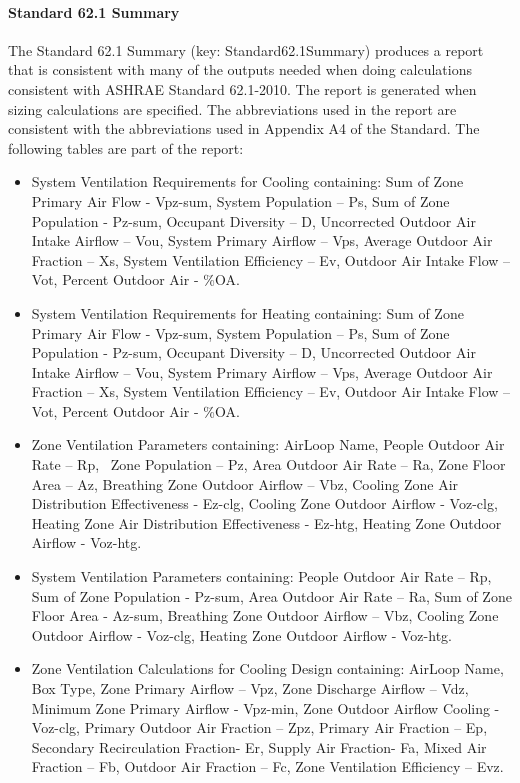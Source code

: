 \paragraph{Standard 62.1 Summary}\label{standard-62.1-summary}

The Standard 62.1 Summary (key: Standard62.1Summary) produces a report that is consistent with many of the outputs needed when doing calculations consistent with ASHRAE Standard 62.1-2010. The report is generated when sizing calculations are specified. The abbreviations used in the report are consistent with the abbreviations used in Appendix A4 of the Standard. The following tables are part of the report:

\begin{itemize}
\item
  System Ventilation Requirements for Cooling containing: Sum of Zone Primary Air Flow - Vpz-sum, System Population -- Ps, Sum of Zone Population - Pz-sum, Occupant Diversity -- D, Uncorrected Outdoor Air Intake Airflow -- Vou, System Primary Airflow -- Vps, Average Outdoor Air Fraction -- Xs, System Ventilation Efficiency -- Ev, Outdoor Air Intake Flow -- Vot, Percent Outdoor Air - \%OA.
\item
  System Ventilation Requirements for Heating containing: Sum of Zone Primary Air Flow - Vpz-sum, System Population -- Ps, Sum of Zone Population - Pz-sum, Occupant Diversity -- D, Uncorrected Outdoor Air Intake Airflow -- Vou, System Primary Airflow -- Vps, Average Outdoor Air Fraction -- Xs, System Ventilation Efficiency -- Ev, Outdoor Air Intake Flow -- Vot, Percent Outdoor Air - \%OA.
\item
  Zone Ventilation Parameters containing: AirLoop Name, People Outdoor Air Rate -- Rp, ~Zone Population -- Pz, Area Outdoor Air Rate -- Ra, Zone Floor Area -- Az, Breathing Zone Outdoor Airflow -- Vbz, Cooling Zone Air Distribution Effectiveness - Ez-clg, Cooling Zone Outdoor Airflow - Voz-clg, Heating Zone Air Distribution Effectiveness - Ez-htg, Heating Zone Outdoor Airflow - Voz-htg.
\item
  System Ventilation Parameters containing: People Outdoor Air Rate -- Rp, Sum of Zone Population - Pz-sum, Area Outdoor Air Rate -- Ra, Sum of Zone Floor Area - Az-sum, Breathing Zone Outdoor Airflow -- Vbz, Cooling Zone Outdoor Airflow - Voz-clg, Heating Zone Outdoor Airflow - Voz-htg.
\item
  Zone Ventilation Calculations for Cooling Design containing: AirLoop Name, Box Type, Zone Primary Airflow -- Vpz, Zone Discharge Airflow -- Vdz, Minimum Zone Primary Airflow - Vpz-min, Zone Outdoor Airflow Cooling - Voz-clg, Primary Outdoor Air Fraction -- Zpz, Primary Air Fraction -- Ep, Secondary Recirculation Fraction- Er, Supply Air Fraction- Fa, Mixed Air Fraction -- Fb, Outdoor Air Fraction -- Fc, Zone Ventilation Efficiency -- Evz.

\end{itemize}
